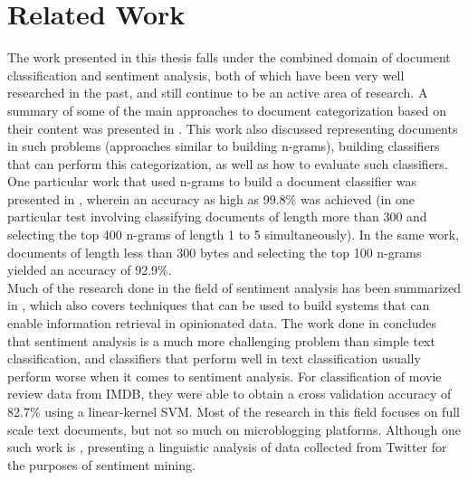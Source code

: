 \chapter{Related Work}
\label{chapter:Related Work}

The work presented in this thesis falls under the combined domain of document classification and sentiment analysis, both of which have been very well researched in the past, and still continue to be an active area of research. A summary of some of the main approaches to document categorization based on their content was presented in \cite{sebastiani2002machine}. This work also discussed representing documents in such problems (approaches similar to building n-grams), building classifiers that can perform this categorization, as well as how to evaluate such classifiers. One particular work that used n-grams to build a document classifier was presented in \cite{cavnar1994n}, wherein an accuracy as high as 99.8\% was achieved (in one particular test involving classifying documents of length more than 300 and selecting the top 400 n-grams of length 1 to 5 simultaneously). In the same work, documents of length less than 300 bytes and selecting the top 100 n-grams yielded an accuracy of 92.9\%.\\

Much of the research done in the field of sentiment analysis has been summarized in \cite{pang2008opinion}, which also covers techniques that can be used to build systems that can enable information retrieval in opinionated data. The work done in \cite{pang2002thumbs} concludes that sentiment analysis is a much more challenging problem than simple text classification, and classifiers that perform well in text classification usually perform worse when it comes to sentiment analysis. For classification of movie review data from IMDB, they were able to obtain a cross validation accuracy of 82.7\% using a linear-kernel SVM. Most of the research in this field focuses on full scale text documents, but not so much on microblogging platforms. Although one such work is \cite{pak2010twitter}, presenting a linguistic analysis of data collected from Twitter for the purposes of sentiment mining.\\

